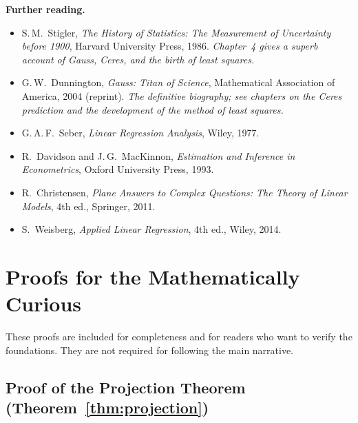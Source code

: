 \documentclass[11pt,a4paper]{article}
\theoremstyle{plain}
\theoremstyle{definition}
\begin{document}
\bigskip
\noindent\textbf{Further reading.}
\begin{itemize}[nosep]
  \item S.\,M.\ Stigler, \emph{The History of Statistics: The Measurement of
        Uncertainty before 1900}, Harvard University Press, 1986.
        \textit{Chapter~4 gives a superb account of Gauss, Ceres, and the
        birth of least squares.}
  \item G.\,W.\ Dunnington, \emph{Gauss: Titan of Science}, Mathematical
        Association of America, 2004 (reprint).
        \textit{The definitive biography; see chapters on the Ceres
        prediction and the development of the method of least squares.}
  \item G.\,A.\,F.\ Seber, \emph{Linear Regression Analysis}, Wiley, 1977.
  \item R.\ Davidson and J.\,G.\ MacKinnon, \emph{Estimation and Inference
        in Econometrics}, Oxford University Press, 1993.
  \item R.\ Christensen, \emph{Plane Answers to Complex Questions: The Theory
        of Linear Models}, 4th ed., Springer, 2011.
  \item S.\ Weisberg, \emph{Applied Linear Regression}, 4th ed., Wiley, 2014.
\end{itemize}


\appendix
\section{Proofs for the Mathematically Curious}\label{app:proofs}

These proofs are included for completeness and for readers who want
to verify the foundations. They are not required for following the
main narrative.


\subsection{Proof of the Projection Theorem (Theorem~\ref{thm:projection})}
\end{document}
